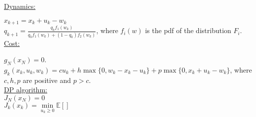\documentclass[11pt, english]{article}
\begin{document}
\underline{Dynamics:\\}

$x_{k+1}=x_k+u_k-w_k$\\
$q_{k+1}=\frac{q_kf_1(w_k)}{q_kf_1(w_k)+(1-q_k)f_2(w_k)}$, where $f_i(w)$ is the pdf of the distribution $F_i$.\\

\underline{Cost:\\}

$g_N(x_N)=0$.\\
$g_k(x_k,u_k,w_k)=cu_k+h\max\{0,w_k-x_k-u_k\}+p\max\{0,x_k+u_k-w_k\}$, where $c,h,p$ are positive and $p>c$.\\

\underline{DP algorithm:}\\

$J_N(x_N)=0$\\
$J_k(x_k)=\underset{u_k\geq 0}{\min}\mathbb{E}\left[\right]$
\end{document}
